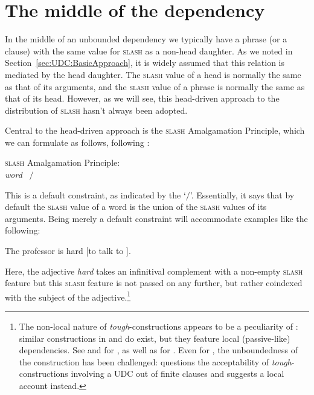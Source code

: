\documentclass[output=paper
,notxmath 
 	        ,biblatex
                ,babelshorthands
                ,newtxmath
                ,draftmode
                ,colorlinks, citecolor=brown
]{langscibook}
\begin{document}
\section{The middle of the dependency}
\label{sec:UDC:Middle}

In the middle of an unbounded dependency we typically have a phrase
(or a clause) with the same value for \textsc{slash} as a non-head daughter. As
we noted in Section~\ref{sec:UDC:BasicApproach}, it is widely assumed
that this relation is mediated by the head daughter. The \textsc{slash} value
of a head is normally the same as that of its arguments, and the \textsc{slash}
value of a phrase is normally the same as that of its head. However,
as we will see, this head-driven approach to the distribution of \textsc{slash}
hasn't always been adopted.

Central to the head-driven approach is the \textsc{slash} Amalgamation Principle,
which we can formulate as follows, following \citet[199]{Ginzburg:Sag:01}:

\ea
\label{fig:UDC:32}
\textsc{slash} Amalgamation Principle:\\
   \textit{word} \impl ~$\slash$%
\z

\noindent
This is a default constraint, as indicated by the `$\slash$'\is{$\slash$}. Essentially,
it says that by default the \textsc{slash} value of a word
is the union of the \textsc{slash} values of its arguments.  Being
merely a
default constraint will accommodate examples like the following:

\begin{exe}
\ex \label{ex:UDC:33}
The professor is hard [to talk to \trace{}].
\end{exe}

\noindent
Here, the adjective \emph{hard} takes an infinitival complement with a
non-empty \textsc{slash} feature 
but this  \textsc{slash} feature
is not passed on any further, but rather coindexed with the subject of
the adjective.\footnote{The
  non-local nature of \textit{tough}-constructions appears to be a
  peculiarity of : similar constructions in  and 
  do exist, but they feature local (passive-like) dependencies. See
  \citet{abeille_a-godard_d-miller_p-sag_i95} and
  \citet{aguila-multner18} for , as well as \citet[Section~3.1.5]{Mueller:02b}
  for . Even for , the unboundedness of the construction
  has been challenged: \citet{Grover:95} questions the acceptability
  of  \textit{tough}-constructions involving a UDC out of
  finite clauses and suggests a local account instead.}
\end{document}

